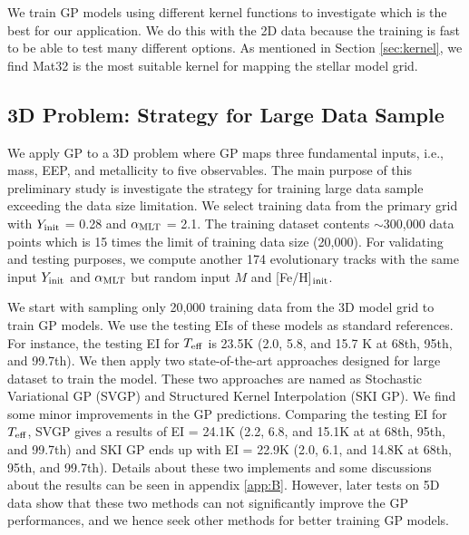 We train GP models using different kernel functions to investigate which is the best for our application. We do this with the 2D data because the training is fast to be able to test many different options. As mentioned in Section \ref{sec:kernel}, we find Mat32 is the most suitable kernel for mapping the stellar model grid.  


\subsection{3D Problem: Strategy for Large Data Sample}\label{sec:3d}

We apply GP to a 3D problem where GP maps three fundamental inputs, i.e., mass, EEP, and metallicity to five observables. The main purpose of this preliminary study is investigate the strategy for training large data sample exceeding the data size limitation. 
%
We select training data from the primary grid with $Y_{\rm init}$ = 0.28 and $\alpha_{\rm MLT}$ = 2.1. The training dataset contents $\sim$300,000 data points which is 15 times the limit of training data size (20,000).  For validating and testing purposes, we compute another 174 evolutionary tracks with the same input $Y_{\rm init}$ and $\alpha_{\rm MLT}$ but random input $M$ and [Fe/H]$_{\rm init}$. 

We start with sampling only 20,000 training data from the 3D model grid to train GP models. We use the testing EIs of these models as standard references. For instance, the testing EI for $T_{\rm eff}$ is 23.5K (2.0, 5.8, and 15.7 K at 68th, 95th, and 99.7th). 
%
We then apply two state-of-the-art approaches designed for large dataset to train the model. These two approaches are named as Stochastic Variational GP (SVGP) and Structured Kernel Interpolation (SKI GP). We find some minor improvements in the GP predictions. Comparing the testing EI for $T_{\rm eff}$, SVGP gives a results of EI = 24.1K (2.2, 6.8, and 15.1K at  at 68th, 95th, and 99.7th) and SKI GP ends up with  EI = 22.9K (2.0, 6.1, and 14.8K at 68th, 95th, and 99.7th). Details about these two implements and some discussions about the results can be seen in appendix \ref{app:B}. However, later tests on 5D data show that these two methods can not significantly improve the GP performances, and we hence seek other methods for better training GP models.


